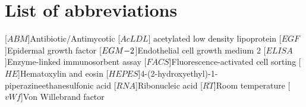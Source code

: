 \clearpage
\chapter*{\textbf{List of abbreviations}}\label{abblist}
\begin{acronym}[YTM]
\setlength{\itemsep}{-\parsep}

[$ABM$]{\hspace{1.9cm}Antibiotic/Antimycotic}
[$AcLDL$]{\hspace{1.5cm} acetylated low density lipoprotein}
[$EGF$]{\hspace{2cm}Epidermal growth factor}
[$EGM\small{-2}$]{\hspace{1.38cm}Endothelial cell growth medium 2}
[$ELISA$]{\hspace{1.62cm}Enzyme-linked immunosorbent assay}
[$FACS$]{\hspace{1.75cm}Fluorescence-activated cell sorting}
[$HE$]{\hspace{2cm}Hematoxylin and eosin}
[$HEPES$]{\hspace{1.42cm}4-(2-hydroxyethyl)-1-piperazineethanesulfonic acid}
[$RNA$]{\hspace{2cm}Ribonucleic acid}
[$RT$]{\hspace{2cm}Room temperature}
[$vWf$]{\hspace{2cm}Von Willebrand factor}


\end{acronym}

